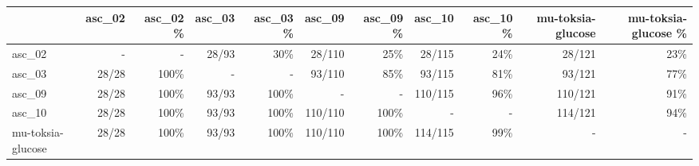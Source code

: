 \begin{tabular}{lrrrrrrrrrr}
\toprule
 & asc_02 & asc_02 \% & asc_03 & asc_03 \% & asc_09 & asc_09 \% & asc_10 & asc_10 \% & mu-toksia-glucose & mu-toksia-glucose \% \\
\midrule
asc_02 & - & - & 28/93 & 30\% & 28/110 & 25\% & 28/115 & 24\% & 28/121 & 23\% \\
asc_03 & 28/28 & 100\% & - & - & 93/110 & 85\% & 93/115 & 81\% & 93/121 & 77\% \\
asc_09 & 28/28 & 100\% & 93/93 & 100\% & - & - & 110/115 & 96\% & 110/121 & 91\% \\
asc_10 & 28/28 & 100\% & 93/93 & 100\% & 110/110 & 100\% & - & - & 114/121 & 94\% \\
mu-toksia-glucose & 28/28 & 100\% & 93/93 & 100\% & 110/110 & 100\% & 114/115 & 99\% & - & - \\
\bottomrule
\end{tabular}
